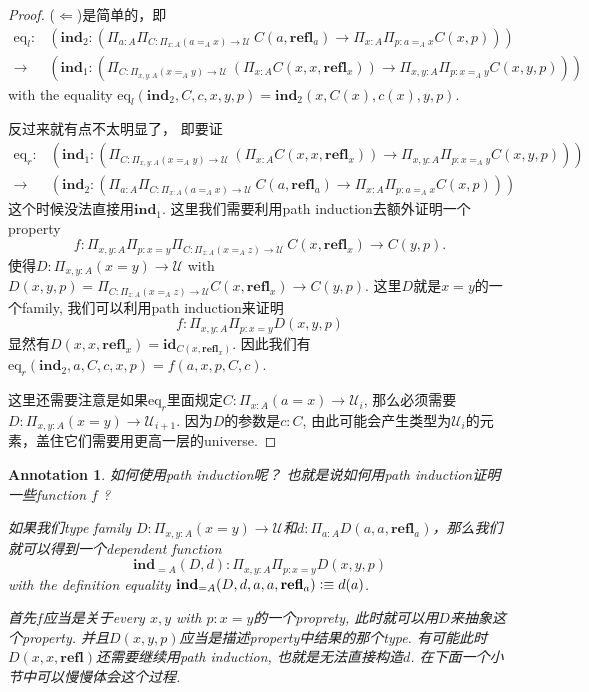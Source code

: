 \documentclass{article}
\newtheorem{annotation}[theorem]{Annotation}
\newcommand{\defeqv}{\vcentcolon\equiv}
\newcommand{\refl}{\textbf{refl}}
\newcommand{\id}{\textbf{id}}
\newcommand{\ind}{\textbf{ind}}
\begin{document}
\begin{proof}
($\Leftarrow$)是简单的，即
\[
    \begin{aligned}
     \text{eq}_l : &(\ind_2 :(\Pi_{a : A} \Pi_{C : \Pi_{x : A} (a =_A x) \to \mathcal{U}}~  C(a,\refl_a) \to \Pi_{x : A} \Pi_{p : a=_A x} C(x, p))) \\ 
     \to&(\ind_1 : (\Pi_{C : \Pi_{x, y : A} (x =_A y) \to \mathcal{U}}~ (\Pi_{x : A} C(x,x,\refl_x)) \to \Pi_{x, y : A} \Pi_{p : x=_A y} C(x,y,p)))
    \end{aligned}
\]
with the equality $\text{eq}_l(\ind_2, C, c, x, y, p) = \ind_2(x, C(x), c(x), y, p)$.

反过来就有点不太明显了， 即要证
\[
    \begin{aligned}
     \text{eq}_r : &(\ind_1 : (\Pi_{C : \Pi_{x, y : A} (x =_A y) \to \mathcal{U}}~ (\Pi_{x : A} C(x,x,\refl_x)) \to \Pi_{x, y : A} \Pi_{p : x=_A y} C(x,y,p)))  \\
     \to&(\ind_2 :(\Pi_{a : A} \Pi_{C : \Pi_{x : A} (a =_A x) \to \mathcal{U}}~  C(a,\refl_a) \to \Pi_{x : A} \Pi_{p : a=_A x} C(x, p)))
    \end{aligned}
\]
这个时候没法直接用$\ind_1$. 这里我们需要利用path induction去额外证明一个property
\[
    f : \Pi_{x,y : A} \Pi_{p : x = y} \Pi_{C : \Pi_{z : A} (x =_A z) \to \mathcal{U}} ~ C(x,\refl_x) \to C(y,p).
\]
使得$D : \Pi_{x, y : A} (x = y) \to \mathcal{U}$ with $D(x, y, p) = \Pi_{C : \Pi_{z : A} (x =_A z) \to \mathcal{U}} C(x,\refl_x) \to C(y,p)$. 这里$D$就是$x = y$的一个family, 我们可以利用path induction来证明
\[
    f : \Pi_{x,y : A} \Pi_{p : x = y} D(x,y,p) 
\]
显然有$D(x,x,\refl_x) = \id_{C(x,\refl_x)}$. 因此我们有$\text{eq}_r(\ind_2, a, C, c, x, p) = f(a, x, p, C, c)$. 

这里还需要注意是如果$\text{eq}_r$里面规定$C : \Pi_{x : A} (a = x) \to \mathcal{U}_i$, 那么必须需要$D : \Pi_{x, y : A} (x = y) \to \mathcal{U}_{i+1}$.  因为$D$的参数是$c : C$, 由此可能会产生类型为$\mathcal{U}_i$的元素，盖住它们需要用更高一层的universe.
\end{proof}

\begin{annotation}
\rm 如何使用path induction呢？ 也就是说如何用path induction证明一些function $f$ ?

如果我们type family $D : \Pi_{x,y : A} (x = y) \to \mathcal{U}$和$d : \Pi_{a:A} D(a,a,\refl_a)$，那么我们就可以得到一个dependent function
\[
    \ind_{=A}(D,d) : \Pi_{x,y:A}\Pi_{p : x = y} D(x,y,p)
\]
with the definition equality $\ind_{=A}(D,d,a,a,\refl_a) \defeqv d(a)$. 

首先$f$应当是关于every $x,y$ with $p : x=y$的一个proprety, 此时就可以用$D$来抽象这个property. 并且$D(x,y,p)$应当是描述property中结果的那个type. 有可能此时$D(x,x,\refl)$还需要继续用path induction, 也就是无法直接构造$d$. 在下面一个小节中可以慢慢体会这个过程.
\end{annotation}
\end{document}

